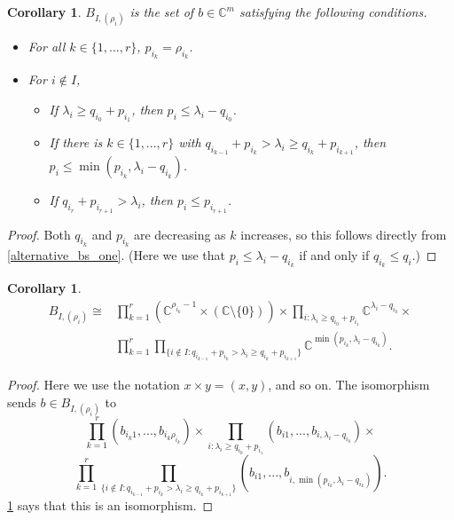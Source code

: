 \documentclass[12pt,psamsfonts]{article}
\newtheorem{corollary}[theorem]{Corollary}
\begin{document}
\begin{corollary}\label{alternative_bs_two}
    \(B_{I, (\rho_i)}\) is the set of \(b \in \mathbb{C}^m\) satisfying the following conditions.
    \begin{itemize}
        \item For all \(k \in \{1, ..., r\}\), \(p_{i_k} = \rho_{i_k}\).
        \item For \(i \notin I\),
        \begin{itemize}
            \item If \(\lambda_i \geq q_{i_0} + p_{i_1}\), then \(p_i \leq \lambda_i - q_{i_0}\).
            \item If there is \(k \in \{1, ..., r\}\) with \(q_{i_{k - 1}} + p_{i_k} > \lambda_i \geq q_{i_k} + p_{i_{k + 1}}\), then \(p_i \leq \min(p_{i_k}, \lambda_i - q_{i_k})\).
            \item If \(q_{i_r} + p_{i_{r + 1}} > \lambda_i\), then \(p_i \leq p_{i_{r + 1}}\).
        \end{itemize}
    \end{itemize}
\end{corollary}
\begin{proof}
    Both \(q_{i_k}\) and \(p_{i_k}\) are decreasing as \(k\) increases, so this follows directly from \cref{alternative_bs_one}.
    (Here we use that \(p_i \leq \lambda_i - q_{i_k}\) if and only if \(q_{i_k} \leq q_i\).)
\end{proof}

\begin{corollary}\label{bs_iso}
    \begin{align*}
        B_{I, (\rho_i)} \cong & \prod_{k = 1}^r (\mathbb{C}^{\rho_{i_k} - 1} \times (\mathbb{C} \setminus \{0\})) \times \prod_{i : \lambda_i \geq q_{i_0} + p_{i_1}} \mathbb{C}^{\lambda_i - q_{i_0}} \times \\
        & \prod_{k = 1}^r \prod_{\{i \notin I : q_{i_{k - 1}} + p_{i_k} > \lambda_i \geq q_{i_k} + p_{i_{k + 1}}\}}\mathbb{C}^{\min(p_{i_k}, \lambda_i - q_{i_k})}.
    \end{align*}
\end{corollary}
\begin{proof}
    Here we use the notation \(x \times y = (x, y)\), and so on.
    The isomorphism sends \(b \in B_{I, (\rho_i)}\) to 
    \[\prod_{k = 1}^{r}(b_{i_k1},..., b_{i_k\rho_{i_k}}) \times \prod_{i : \lambda_i \geq q_{i_0} + p_{i_1}} (b_{i1}, ..., b_{i, \lambda_i - q_{i_0}}) \times\]
    \[\prod_{k = 1}^r \prod_{\{i \notin I : q_{i_{k - 1}} + p_{i_k} > \lambda_i \geq q_{i_k} + p_{i_{k + 1}}\}} (b_{i1}, ..., b_{i,\min(p_{i_k}, \lambda_i - q_{i_k})}).\]
    \cref{alternative_bs_two} says that this is an isomorphism.
\end{proof}
\end{document}
